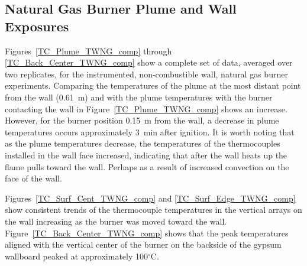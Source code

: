 \documentclass[twoside]{uocthesis}
\begin{document}
{\subsection{Natural Gas Burner Plume and Wall Exposures}
Figures~\ref{TC_Plume_TWNG_comp} through \ref{TC_Back_Center_TWNG_comp} show a complete set of data, averaged over two replicates, for the instrumented, non-combustible wall, natural gas burner experiments.  Comparing the temperatures of the plume at the most distant point from the wall (0.61~m) and with the plume temperatures with the burner contacting the wall in Figure~\ref{TC_Plume_TWNG_comp} shows an increase.  However, for the burner position 0.15~m from the wall, a decrease in plume temperatures occurs approximately 3~min after ignition.  It is worth noting that as the plume temperatures decrease, the temperatures of the thermocouples installed in the wall face increased, indicating that after the wall heats up the flame pulls toward the wall.  Perhaps as a result of increased convection on the face of the wall. 

Figures~\ref{TC_Surf_Cent_TWNG_comp} and \ref{TC_Surf_Edge_TWNG_comp} show consistent trends of the thermocouple temperatures in the vertical arrays on the wall increasing as the burner was moved toward the wall.  Figure~\ref{TC_Back_Center_TWNG_comp} shows that the peak temperatures aligned with the vertical center of the burner on the backside of the gypsum wallboard peaked at approximately 100$^\circ$C.


}
\end{document}
